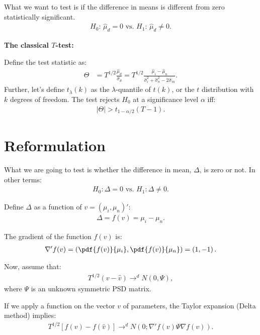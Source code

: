 \documentclass[12pt,oneside,a4paper]{article}
\begin{document}
What we want to test is if the difference in means is different from zero statistically significant.
\begin{align*}
	H_{0}: \, \hat{\mu}_{d} = 0
	\text{ vs. }
	H_{1}: \, \hat{\mu}_{d} \neq 0.
\end{align*}

\textbf{The classical $T$-test:}

Define the test statistic as:
\begin{align}
\Theta &= T^{1/2} \frac{\hat{\mu}_{d}}{\hat{\sigma}_{d}} = 
 T^{1/2} \frac{\hat{\mu}_{i} - \hat{\mu}_{n}}{\hat{\sigma}^2_{i} + \hat{\sigma}^2_{n} - 2\hat{\sigma}_{in}}.
\end{align}
Further, let's define $t_{\lambda}(k)$ as the $\lambda$-quantile of $t(k)$, or the $t$ distribution with $k$ degrees of freedom.
The test rejects $H_{0}$ at a significance level $\alpha$ iff:
\begin{align*}
	|\Theta| > t_{1-\alpha/2}(T-1).
\end{align*}


\clearpage
\section{Reformulation}

What we are going to test is whether the difference in mean, $\Delta$, is zero or not.
In other terms:
\begin{align*}
	H_{0}: \Delta=0 \text{ vs. } H_{1}: \Delta \neq 0.
\end{align*}

Define $\Delta$ as a function of $v = (\mu_{i}, \mu_{n})'$:
\begin{align*}
\Delta = f(v) = \mu_{i} - \mu_{n}.
\end{align*}

The gradient of the function $f(v)$ is:
\begin{align}
\nabla' f(v) =
\left( 
\pdf{f(v)}{\mu_{i}},
\pdf{f(v)}{\mu_{n}}
\right) = \left( 1, -1 \right).
\end{align}

Now, assume that:
\begin{align}
	T^{1/2}(v - \hat{v}) \to^d N(0, \Psi),
\end{align}
where $\Psi$ is an unknown symmetric PSD matrix.

If we apply a function on the vector $v$ of parameters, the Taylor expansion (Delta method) implies:
\begin{align*}
	T^{1/2}[f(v) - f(\hat{v})] \to^d N \left( 0; \nabla'f(v) \Psi \nabla f(v)  \right).
\end{align*}
\end{document}
